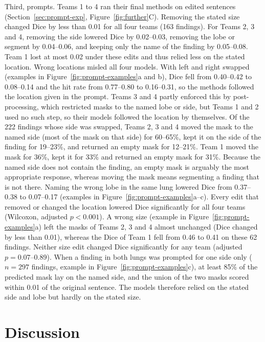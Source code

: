 \documentclass[final,5p,times,twocolumn,authoryear,numafflabel]{elsarticle}
\begin{document}
Third, prompts. Teams 1 to 4 ran their final methods on edited sentences
(Section~\ref{sec:prompt-exp}, Figure~\ref{fig:further}C). Removing the stated size changed Dice by less than 0.01 for all four teams (163
findings). For Teams 2, 3 and 4, removing the side lowered Dice by 0.02--0.03,
removing the lobe or segment by 0.04--0.06, and keeping only the name of the
finding by 0.05--0.08. Team 1 lost at most 0.02 under these edits and thus
relied less on the stated location. Wrong locations misled all four models.
With left and right swapped (examples in Figure~\ref{fig:prompt-examples}a and b), Dice fell from 0.40--0.42 to 0.08--0.14 and the
hit rate from 0.77--0.80 to 0.16--0.31, so the methods followed the location
given in the prompt. Teams 3 and 4 partly enforced this by post-processing, which
restricted masks to the named lobe or side, but Teams 1 and 2 used no such step,
so their models followed the location by themselves. Of the 222 findings whose side was swapped, Teams 2, 3 and 4
moved the mask to the named side (most of the mask on that side) for 60--65\%,
kept it on the side of the finding for 19--23\%, and returned an empty mask for
12--21\%. Team 1 moved the mask for 36\%, kept it for 33\% and returned an
empty mask for 31\%. Because the named side does not contain the finding, an
empty mask is arguably the most appropriate response, whereas moving the mask
means segmenting a finding that is not there. Naming the wrong lobe in the same lung lowered
Dice from 0.37--0.38 to 0.07--0.17 (examples in Figure~\ref{fig:prompt-examples}a--c).
Every edit that removed or changed the location lowered Dice significantly for
all four teams (Wilcoxon, adjusted $p < 0.001$). A
wrong size (example in Figure~\ref{fig:prompt-examples}a) left the masks of Teams 2, 3 and 4 almost unchanged (Dice changed
by less than 0.01), whereas the Dice of Team 1 fell from 0.46 to 0.41 on these
62 findings. Neither size edit changed Dice significantly for any team
(adjusted $p = 0.07$--0.89). When a finding in both lungs was prompted for one side only
($n = 297$ findings, example in Figure~\ref{fig:prompt-examples}c), at least 85\% of the predicted mask lay on the named side, and
the union of the two masks scored within 0.01 of the original sentence. The
models therefore relied on the stated side and lobe but hardly on the stated size.

\section{Discussion}
\label{sec:discussion}
\end{document}

